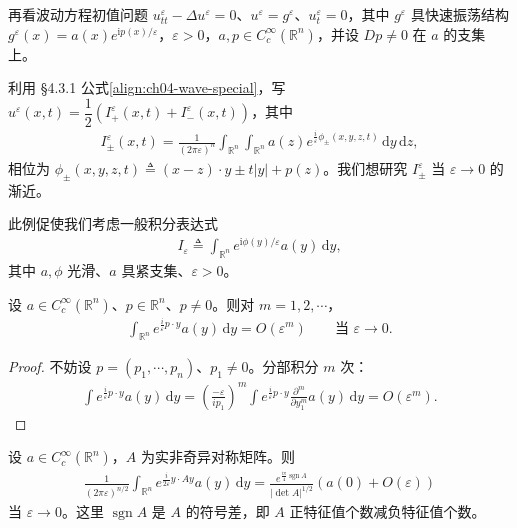 \documentclass[../../main.tex]{subfiles}
\begin{document}
\begin{example}[波动方程的驻相法]\label{example:ch04-stationary-wave}再看波动方程初值问题 $u_{tt}^\varepsilon-\Delta u^\varepsilon=0$、$u^\varepsilon=g^\varepsilon$、$u_t^\varepsilon=0$，其中 $g^\varepsilon$ 具快速振荡结构 $g^\varepsilon(x)=a(x)e^{\mathrm{i}p(x)/\varepsilon}$，$\varepsilon>0$，$a,p\in C_c^\infty(\mathbb{R}^n)$，并设 $Dp\neq 0$ 在 $a$ 的支集上。

利用 \S4.3.1 公式\eqref{align:ch04-wave-special}，写 $u^\varepsilon(x,t)=\dfrac{1}{2}(I_+^\varepsilon(x,t)+I_-^\varepsilon(x,t))$，其中
\begin{align}\label{align:ch04-stationary-integral}
I_\pm^\varepsilon(x,t)=\frac{1}{(2\pi\varepsilon)^n}\int_{\mathbb{R}^n}\int_{\mathbb{R}^n}a(z)e^{\frac{i}{\varepsilon}\phi_\pm(x,y,z,t)}\,\mathrm{d}y\,\mathrm{d}z,
\end{align}
相位为 $\phi_\pm(x,y,z,t)\triangleq(x-z)\cdot y\pm t|y|+p(z)$。我们想研究 $I_\pm^\varepsilon$ 当 $\varepsilon\to 0$ 的渐近。
\end{example}

此例促使我们考虑一般积分表达式
\begin{align}\label{align:ch04-general-phase}
I_\varepsilon\triangleq\int_{\mathbb{R}^n}e^{\mathrm{i}\phi(y)/\varepsilon}a(y)\,\mathrm{d}y,
\end{align}
其中 $a,\phi$ 光滑、$a$ 具紧支集、$\varepsilon>0$。

\begin{lemma}[线性项的渐近]\label{lemma:ch04-stationary-linear}设 $a\in C_c^\infty(\mathbb{R}^n)$、$p\in\mathbb{R}^n$、$p\neq 0$。则对 $m=1,2,\cdots$，
\begin{align}\label{align:ch04-linear-asymptotic}
\int_{\mathbb{R}^n}e^{\frac{i}{\varepsilon}p\cdot y}a(y)\,\mathrm{d}y=O(\varepsilon^m) \qquad\text{当 }\varepsilon\to 0.
\end{align}
\end{lemma}

\begin{proof}
不妨设 $p=(p_1,\cdots,p_n)$、$p_1\neq 0$。分部积分 $m$ 次：
\begin{align*}
\int e^{\frac{i}{\varepsilon}p\cdot y}a(y)\,\mathrm{d}y=\left(\frac{-\varepsilon}{ip_1}\right)^m\int e^{\frac{i}{\varepsilon}p\cdot y}\frac{\partial^m}{\partial y_1^m}a(y)\,\mathrm{d}y=O(\varepsilon^m).
\end{align*}
\end{proof}

\begin{lemma}[二次项的渐近]\label{lemma:ch04-stationary-quadratic}设 $a\in C_c^\infty(\mathbb{R}^n)$，$A$ 为实非奇异对称矩阵。则
\begin{align}\label{align:ch04-quadratic-asymptotic}
\frac{1}{(2\pi\varepsilon)^{n/2}}\int_{\mathbb{R}^n}e^{\frac{i}{2\varepsilon}y\cdot Ay}a(y)\,\mathrm{d}y=\frac{e^{\frac{i\pi}{4}\operatorname{sgn}A}}{|\det A|^{1/2}}(a(0)+O(\varepsilon))
\end{align}
当 $\varepsilon\to 0$。这里 $\operatorname{sgn}A$ 是 $A$ 的符号差，即 $A$ 正特征值个数减负特征值个数。
\end{lemma}
\end{document}
